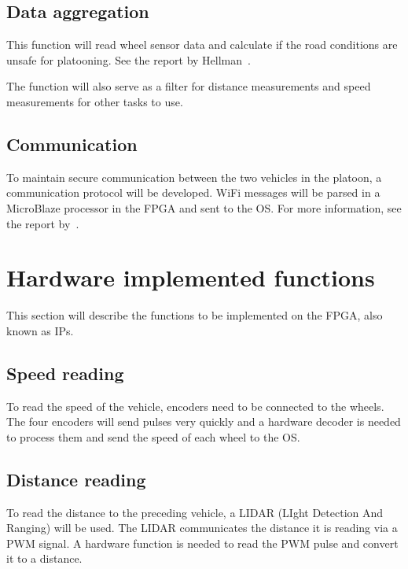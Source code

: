 \subsection{Data aggregation}
This function will read wheel sensor data and calculate if the road conditions are unsafe for platooning. See the report by Hellman~\cite{hellman2017}.

The function will also serve as a filter for distance measurements and speed measurements for other tasks to use.

\subsection{Communication}
To maintain secure communication between the two vehicles in the platoon, a communication protocol will be developed. WiFi messages will be parsed in a MicroBlaze processor in the FPGA and sent to the OS. For more information, see the report by~\cite{lerander2017}.


\section{Hardware implemented functions}
This section will describe the functions to be implemented on the FPGA, also known as IPs.

\subsection{Speed reading}
To read the speed of the vehicle, encoders need to be connected to the wheels. The four encoders will send pulses very quickly and a hardware decoder is needed to process them and send the speed of each wheel to the OS.

\subsection{Distance reading}
To read the distance to the preceding vehicle, a LIDAR (LIght Detection And Ranging) will be used. The LIDAR communicates the distance it is reading via a PWM signal. A hardware function is needed to read the PWM pulse and convert it to a distance.

